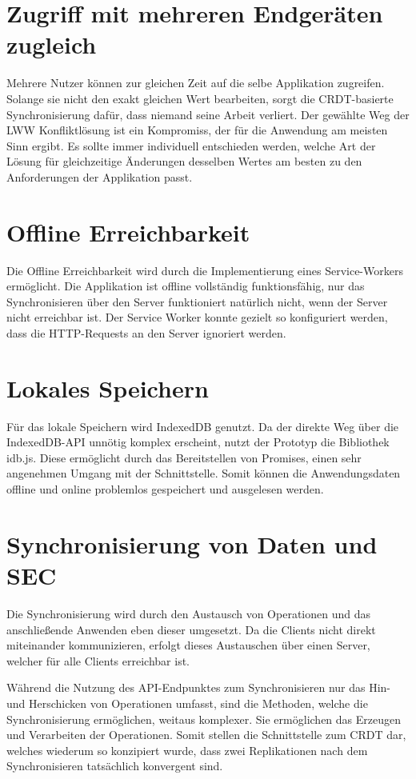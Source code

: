 \documentclass[a4paper, 12pt]{scrreprt}
\begin{document}
\section{Zugriff mit mehreren Endgeräten zugleich}
Mehrere Nutzer können zur gleichen Zeit auf die selbe Applikation zugreifen. Solange sie nicht den exakt gleichen Wert bearbeiten, sorgt die CRDT-basierte Synchronisierung dafür, dass niemand seine Arbeit verliert. Der gewählte Weg der \ac{LWW} Konfliktlösung ist ein Kompromiss, der für die Anwendung am meisten Sinn ergibt. Es sollte immer individuell entschieden werden, welche Art der Lösung für gleichzeitige Änderungen desselben Wertes am besten zu den Anforderungen der Applikation passt.

\section{Offline Erreichbarkeit}
Die Offline Erreichbarkeit wird durch die Implementierung eines Service-Workers ermöglicht. Die Applikation ist offline vollständig funktionsfähig, nur das Synchronisieren über den Server funktioniert natürlich nicht, wenn der Server nicht erreichbar ist. Der Service Worker konnte gezielt so konfiguriert werden, dass die HTTP-Requests an den Server ignoriert werden.

\section{Lokales Speichern}
Für das lokale Speichern wird IndexedDB genutzt. Da der direkte Weg über die IndexedDB-API unnötig komplex erscheint, nutzt der Prototyp die Bibliothek idb.js. Diese ermöglicht durch das Bereitstellen von Promises, einen sehr angenehmen Umgang mit der Schnittstelle. Somit können die Anwendungsdaten offline und online problemlos gespeichert und ausgelesen werden.

\section{Synchronisierung von Daten und SEC}

Die Synchronisierung wird durch den Austausch von Operationen und das anschließende Anwenden eben dieser umgesetzt. Da die Clients nicht direkt miteinander kommunizieren, erfolgt dieses Austauschen über einen Server, welcher für alle Clients erreichbar ist. 

Während die Nutzung des API-Endpunktes zum Synchronisieren nur das Hin- und Herschicken von Operationen umfasst, sind die Methoden, welche die Synchronisierung ermöglichen, weitaus komplexer. Sie ermöglichen das Erzeugen und Verarbeiten der Operationen. Somit stellen die Schnittstelle zum CRDT dar, welches wiederum so konzipiert wurde, dass zwei Replikationen nach dem Synchronisieren tatsächlich konvergent sind.
\end{document}
